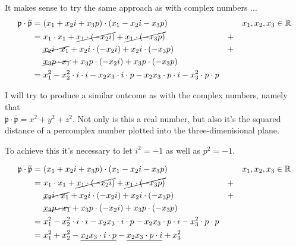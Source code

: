 \documentclass[a4paper,english,parskip]{scrartcl}
\begin{document}
It makes sense to try the same approach as with complex numbers ...
\begin{align*}
\mathfrak{p} \cdot \overline{\mathfrak{p}} = \hspace{3pt}& (x_1 + x_2i +x_3p) \cdot (x_1 - x_2i - x_3p) &&& x_1,x_2,x_3 \in \mathbb{R} \\
= \hspace{3pt} & x_1 \cdot x_1 + \cancel{x_1 \cdot (-x_2i)} + \cancel{x_1 \cdot (-x_3p)}  &+ \\
& \cancel{x_2i \cdot x_1} + x_2i \cdot (-x_2i) + x_2i \cdot (-x_3p) &+ \\
& \cancel{x_3p \cdot x_1} + x_3p \cdot (-x_2i) + x_3p \cdot (-x_3p) \\
= \hspace{3pt} & x_1^2 - x_2^2 \cdot i \cdot i - x_2x_3 \cdot i \cdot p - x_2x_3 \cdot p \cdot i - x_3^2 \cdot p \cdot p
\end{align*}

I will try to produce a similar outcome as with the complex numbers, namely that \\
$\mathfrak{p} \cdot \overline{\mathfrak{p}} = x^2 + y^2 + z^2 $.
Not only is this a real number, but also it's the squared distance of a percomplex number plotted into the three-dimenisional plane.

To achieve this it's necessary to let $i^2 = -1$ as well as $p^2 = -1 $.

\begin{align*}
\mathfrak{p} \cdot \overline{\mathfrak{p}} = \hspace{3pt}& (x_1 + x_2i +x_3p) \cdot (x_1 - x_2i - x_3p) &&& x_1,x_2,x_3 \in \mathbb{R} \\
= \hspace{3pt} & x_1 \cdot x_1 + \cancel{x_1 \cdot (-x_2i)} + \cancel{x_1 \cdot (-x_3p)}  &+ \\
& \cancel{x_2i \cdot x_1} + x_2i \cdot (-x_2i) + x_2i \cdot (-x_3p) &+ \\
& \cancel{x_3p \cdot x_1} + x_3p \cdot (-x_2i) + x_3p \cdot (-x_3p) \\
= \hspace{3pt} & x_1^2 - x_2^2 \cdot i \cdot i - x_2x_3 \cdot i \cdot p - x_2x_3 \cdot p \cdot i - x_3^2 \cdot p \cdot p \\
= \hspace{3pt} & x_1^2 + x_2^2 - \underline{x_2x_3 \cdot i \cdot p} - \underline{x_2x_3 \cdot p \cdot i} + x_3^2
\end{align*}
\end{document}
